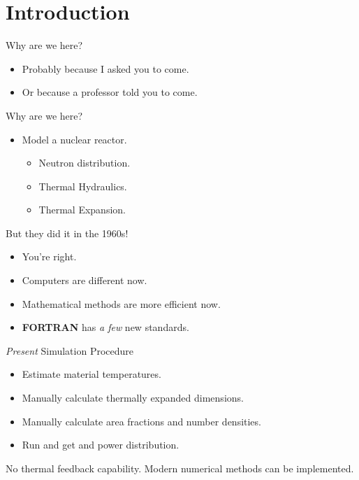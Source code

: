 \section{Introduction}
\label{sec:introduction}

\begin{frame}{Why are we here?}
  \pause
  \begin{itemize}
    \item Probably because I asked you to come.
    \item Or because a professor told you to come.
  \end{itemize}
\end{frame}

\begin{frame}{Why are we here?}
  \begin{itemize}
    \item {\huge Model a nuclear reactor.}
      \pause
      \begin{itemize}
        \item Neutron distribution.
        \item Thermal Hydraulics.
        \item Thermal Expansion.
      \end{itemize}
  \end{itemize}
\end{frame}

\begin{frame}{But they did it in the 1960s!}
  \begin{itemize}
    \pause 
    \item You're right.
    \pause
    \item Computers are different now.
    \item Mathematical methods are more efficient now.
    \item \textbf{FORTRAN} has \textit{a few} new standards.
  \end{itemize}
\end{frame}

\begin{frame}{\textit{Present} Simulation Procedure}
  \begin{itemize}
    \item Estimate material temperatures.
    \item Manually calculate thermally expanded dimensions.
    \item Manually calculate area fractions and number densities.
    \item Run \dif and get \keff and power distribution.
    \pause
  \end{itemize}
  \vspace{0.3in}
  \begin{block}{}
    No thermal feedback capability. Modern numerical methods can be
    implemented.
  \end{block}
\end{frame}

